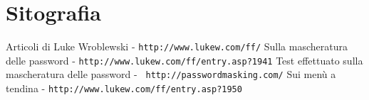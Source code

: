 \section{Sitografia}

\renewcommand{\section}[2]{}
\begin{thebibliography}{9}

 Articoli di Luke Wroblewski - \texttt{http://www.lukew.com/ff/}
 Sulla mascheratura delle password - \texttt{http://www.lukew.com/ff/entry.asp?1941}
 Test effettuato sulla mascheratura delle password - \texttt{ http://passwordmasking.com/}
 Sui menù a tendina - \texttt{http://www.lukew.com/ff/entry.asp?1950}

\end{thebibliography}